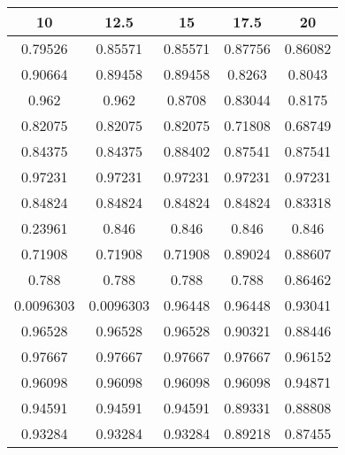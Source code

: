 \begin{tabular}{|c|c|c|c|c|}
\hline 
10 & 12.5 & 15 & 17.5 & 20 \\ 
\hline 
0.79526 & 0.85571 & 0.85571 & 0.87756 & 0.86082 \\ 
0.90664 & 0.89458 & 0.89458 & 0.8263 & 0.8043 \\ 
0.962 & 0.962 & 0.8708 & 0.83044 & 0.8175 \\ 
0.82075 & 0.82075 & 0.82075 & 0.71808 & 0.68749 \\ 
0.84375 & 0.84375 & 0.88402 & 0.87541 & 0.87541 \\ 
0.97231 & 0.97231 & 0.97231 & 0.97231 & 0.97231 \\ 
0.84824 & 0.84824 & 0.84824 & 0.84824 & 0.83318 \\ 
0.23961 & 0.846 & 0.846 & 0.846 & 0.846 \\ 
0.71908 & 0.71908 & 0.71908 & 0.89024 & 0.88607 \\ 
0.788 & 0.788 & 0.788 & 0.788 & 0.86462 \\ 
0.0096303 & 0.0096303 & 0.96448 & 0.96448 & 0.93041 \\ 
0.96528 & 0.96528 & 0.96528 & 0.90321 & 0.88446 \\ 
0.97667 & 0.97667 & 0.97667 & 0.97667 & 0.96152 \\ 
0.96098 & 0.96098 & 0.96098 & 0.96098 & 0.94871 \\ 
0.94591 & 0.94591 & 0.94591 & 0.89331 & 0.88808 \\ 
0.93284 & 0.93284 & 0.93284 & 0.89218 & 0.87455 \\ 
\hline 
\end{tabular}